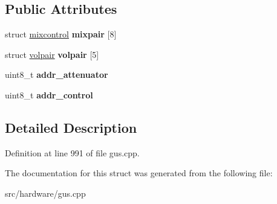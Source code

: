 \subsection*{Public Attributes}
\begin{DoxyCompactItemize}
\item 
\hypertarget{structgus__ICS2101_a7e5b7610442c6f3de38ae67487d9ccfa}{struct \hyperlink{structgus__ICS2101_1_1mixcontrol}{mixcontrol} {\bfseries mixpair} \mbox{[}8\mbox{]}}\label{structgus__ICS2101_a7e5b7610442c6f3de38ae67487d9ccfa}

\item 
\hypertarget{structgus__ICS2101_af99b01cfc9793b759b5c309fd605b563}{struct \hyperlink{structgus__ICS2101_1_1volpair}{volpair} {\bfseries volpair} \mbox{[}5\mbox{]}}\label{structgus__ICS2101_af99b01cfc9793b759b5c309fd605b563}

\item 
\hypertarget{structgus__ICS2101_a259bb6122df1b8689fdf2c5445f23623}{uint8\-\_\-t {\bfseries addr\-\_\-attenuator}}\label{structgus__ICS2101_a259bb6122df1b8689fdf2c5445f23623}

\item 
\hypertarget{structgus__ICS2101_ab1b4294e06737b43bd2fba7eeaee46ee}{uint8\-\_\-t {\bfseries addr\-\_\-control}}\label{structgus__ICS2101_ab1b4294e06737b43bd2fba7eeaee46ee}

\end{DoxyCompactItemize}


\subsection{Detailed Description}


Definition at line 991 of file gus.\-cpp.



The documentation for this struct was generated from the following file\-:\begin{DoxyCompactItemize}
\item 
src/hardware/gus.\-cpp\end{DoxyCompactItemize}
